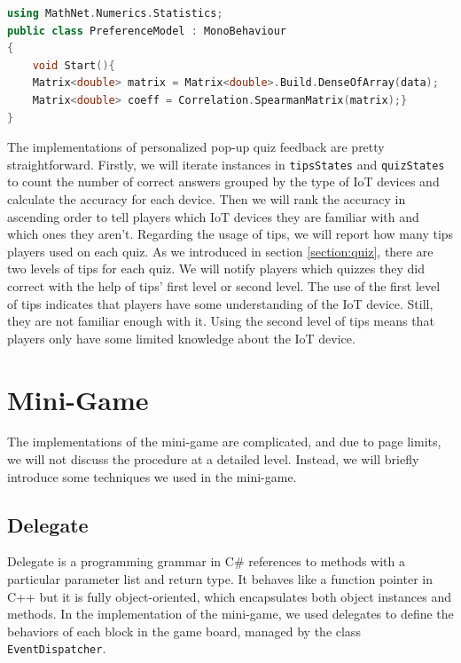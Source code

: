 \documentclass[msc,deptreport,ai]{infthesis}      %
\begin{document}
\begin{lstlisting}[caption=Calculate correlation coefficient with MathNet,label={lst:matrix},language=C++]
using MathNet.Numerics.Statistics;
public class PreferenceModel : MonoBehaviour
{
    void Start(){
    Matrix<double> matrix = Matrix<double>.Build.DenseOfArray(data);
    Matrix<double> coeff = Correlation.SpearmanMatrix(matrix);}
}
\end{lstlisting}

The implementations of personalized pop-up quiz feedback are pretty straightforward. Firstly, we will iterate instances in \texttt{tipsStates} and \texttt{quizStates} to count the number of correct answers grouped by the type of IoT devices and calculate the accuracy for each device. Then we will rank the accuracy in ascending order to tell players which IoT devices they are familiar with and which ones they aren't. Regarding the usage of tips, we will report how many tips players used on each quiz. As we introduced in section \ref{section:quiz}, there are two levels of tips for each quiz. We will notify players which quizzes they did correct with the help of tips' first level or second level. The use of the first level of tips indicates that players have some understanding of the IoT device. Still, they are not familiar enough with it. Using the second level of tips means that players only have some limited knowledge about the IoT device.

\section{Mini-Game}

The implementations of the mini-game are complicated, and due to page limits, we will not discuss the procedure at a detailed level. Instead, we will briefly introduce some techniques we used in the mini-game.

\subsection{Delegate}

Delegate is a programming grammar in C\# references to methods with a particular parameter list and return type. It behaves like a function pointer in C++ but it is fully object-oriented, which encapsulates both object instances and methods. In the implementation of the mini-game, we used delegates to define the behaviors of each block in the game board, managed by the class \texttt{EventDispatcher}.
\end{document}
